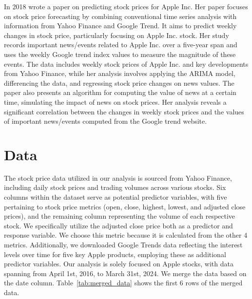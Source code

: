 \documentclass[conference,onecolumn,11pt]{IEEEtran}
\begin{document}
In 2018 \citeauthor{Xu2018} wrote a paper on predicting stock prices for Apple Inc. Her paper focuses on stock price forecasting by combining conventional time series analysis with information from Yahoo Finance and Google Trend. It aims to predict weekly changes in stock price, particularly focusing on Apple Inc. stock. Her study records important news/events related to Apple Inc. over a five-year span and uses the weekly Google trend index values to measure the magnitude of these events. The data includes weekly stock prices of Apple Inc. and key developments from Yahoo Finance, while her analysis involves applying the ARIMA model, differencing the data, and regressing stock price changes on news values. The paper also presents an algorithm for computing the value of news at a certain time, simulating the impact of news on stock prices. Her analysis reveals a significant correlation between the changes in weekly stock prices and the values of important news/events computed from the Google trend website.


\section{Data}

  

The stock price data utilized in our analysis is sourced from Yahoo Finance, including daily stock prices and trading volumes across various stocks. Six columns within the dataset serve as potential predictor variables, with five pertaining to stock price metrics (open, close, highest, lowest, and adjusted close prices), and the remaining column representing the volume of each respective stock. We specifically utilize the adjusted close price both as a predictor and response variable. We choose this metric because it is calculated from the other 4 metrics. Additionally, we downloaded Google Trends data reflecting the interest levels over time for five key Apple products, employing these as additional predictor variables. Our analysis is solely focused on Apple stocks, with data spanning from April 1st, 2016, to March 31st, 2024. We merge the data based on the date column. Table~\ref{tab:merged_data} shows the first 6 rows of the merged data.
\end{document}
